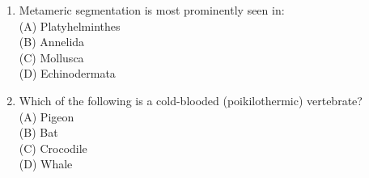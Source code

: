 \documentclass{article}
\begin{document}
\begin{enumerate}[label=Q\arabic*.]
\item Metameric segmentation is most prominently seen in:
\\(A) Platyhelminthes
\\(B) Annelida
\\(C) Mollusca
\\(D) Echinodermata

\item Which of the following is a cold-blooded (poikilothermic) vertebrate?
\\(A) Pigeon
\\(B) Bat
\\(C) Crocodile
\\(D) Whale

\end{enumerate}
\end{document}
